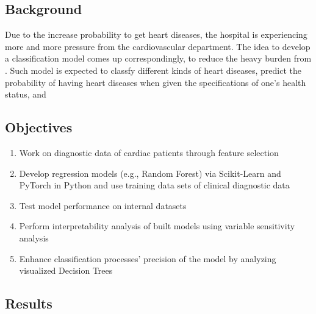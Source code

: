 \documentclass[12pt]{article}
\begin{document}
\subsection{Background}

Due to the increase probability to get heart diseases, the hospital is experiencing more and more pressure from the cardiovascular department. The idea to develop a classification model comes up correspondingly, to reduce the heavy burden from . Such model is expected to classfy different kinds of heart diseases, predict the probability of having heart diseases when given the specifications of one's health status, and  

\subsection{Objectives}

\begin{enumerate}

    \item{\small Work on diagnostic data of cardiac patients through feature selection}
    \item{\small Develop regression models (e.g., Random Forest) via Scikit-Learn and PyTorch in Python and use training data sets of clinical diagnostic data}
    \item{\small Test model performance on internal datasets}
    \item{\small Perform interpretability analysis of built models using variable sensitivity analysis}
    \item{\small Enhance classification processes' precision of the model by analyzing visualized Decision Trees}

\end{enumerate}

\subsection{Results}
\end{document}
